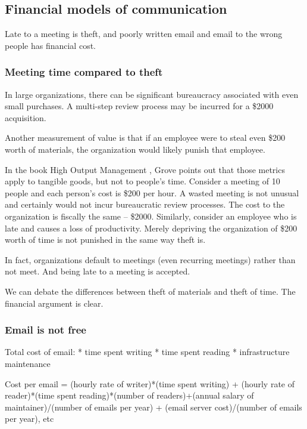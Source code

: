 \subsection{Financial models of communication}

Late to a meeting is theft, and poorly written email and email to the wrong people has financial cost.

\subsubsection{Meeting time compared to theft}

In large organizations, there can be significant bureaucracy associated with even small purchases. A multi-step review process may be incurred for a \$2000 acquisition.

Another measurement of value is that if an employee were to steal even \$200 worth of materials, the organization would likely punish that employee.


In the book High Output Management \cite{1995_Grove}, Grove points out that those metrics apply to tangible goods, but not to people's time. Consider a meeting of 10 people and each person's cost is \$200 per hour. A wasted meeting is not unusual and certainly would not incur bureaucratic review processes. The cost to the organization is fiscally the same -- \$2000. Similarly, consider an employee who is late and causes a loss of productivity. Merely depriving the organization of \$200 worth of time is not punished in the same way theft is.

In fact, organizations default to meetings (even recurring meetings) rather than not meet. And being late to a meeting is accepted. 

We can debate the differences between theft of materials and theft of time. The financial argument is clear. 


\subsubsection{Email is not free}

Total cost of email:
* time spent writing
* time spent reading
* infrastructure maintenance

Cost per email = 
(hourly rate of writer)*(time spent writing) + (hourly rate of reader)*(time spent reading)*(number of readers)+(annual salary of maintainer)/(number of emails per year) + (email server cost)/(number of emails per year), etc

